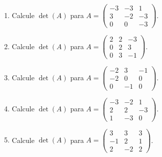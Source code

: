 \documentclass[12pt]{article}
\theoremstyle{remark}
\newcounter{contadorEjercicio}
\newenvironment{listaejercicios}{\begin{enumerate}[label=\textbf{E\arabic*.},leftmargin=2.4em,itemsep=0.52em]\setcounter{enumi}{\value{contadorEjercicio}}}{\setcounter{contadorEjercicio}{\value{enumi}}\end{enumerate}}
\begin{document}
\begin{listaejercicios}
\item Calcule $\det(A)$ para $A=\begin{pmatrix}-3&-3&1\\3&-2&-3\\0&0&-3\end{pmatrix}$.

\item Calcule $\det(A)$ para $A=\begin{pmatrix}2&2&-3\\0&2&3\\0&3&-1\end{pmatrix}$.

\item Calcule $\det(A)$ para $A=\begin{pmatrix}-2&3&-1\\-2&0&0\\0&-1&0\end{pmatrix}$.

\item Calcule $\det(A)$ para $A=\begin{pmatrix}-3&-2&1\\2&2&-3\\1&-3&0\end{pmatrix}$.

\item Calcule $\det(A)$ para $A=\begin{pmatrix}3&3&3\\-1&2&1\\2&-2&2\end{pmatrix}$.

\end{listaejercicios}
\end{document}
